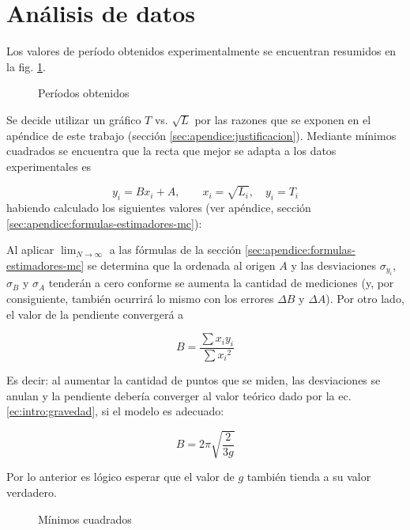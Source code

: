 \section{Análisis de datos}

Los valores de período obtenidos experimentalmente se encuentran resumidos en
la fig. \ref{fig:datos:periodos}.

\begin{figure}[H]
    \centering
    
    \caption{Períodos obtenidos}
    \label{fig:datos:periodos}
\end{figure}

Se decide utilizar un gráfico $T$ vs. $\sqrt{L}$ por las razones que se 
exponen en el apéndice de este trabajo (sección
\ref{sec:apendice:justificacion}). Mediante mínimos cuadrados se 
encuentra que la recta que mejor se adapta a los datos experimentales es

\[
    y_i = Bx_i + A, \quad\quad x_i = \sqrt{L_i}, \quad y_i = T_i
\]
habiendo calculado los siguientes valores (ver apéndice, sección 
\ref{sec:apendice:formulas-estimadores-mc}):

\begin{itemize}
    
\end{itemize}


Al aplicar $\lim_{N\to\infty}$ a las fórmulas de la sección
\ref{sec:apendice:formulas-estimadores-mc} se determina que la ordenada al
origen $A$ y las desviaciones $\sigma_{y_i}$, $\sigma_B$ y $\sigma_A$ tenderán
a cero conforme se aumenta la cantidad de mediciones (y, por consiguiente,
también ocurrirá lo mismo con los errores $\Delta B$ y $\Delta A$). Por otro
lado, el valor de la pendiente convergerá a

\[
    B = \frac{ \sum{x_i y_i} }{ \sum {x_i}^2 }
\]

Es decir: al aumentar la cantidad de puntos que se miden, las desviaciones se
anulan y la pendiente debería converger al valor teórico dado por la ec.
\ref{ec:intro:gravedad}, si el modelo es adecuado:

\[
    B = 2\pi \sqrt{\frac{2}{3g}}
\]

Por lo anterior es lógico esperar que el valor de $g$ también tienda a su valor
verdadero.


\begin{figure}[H]
    \centering
    
    \caption{Mínimos cuadrados}
    \label{fig:datos:regresion}
\end{figure}


